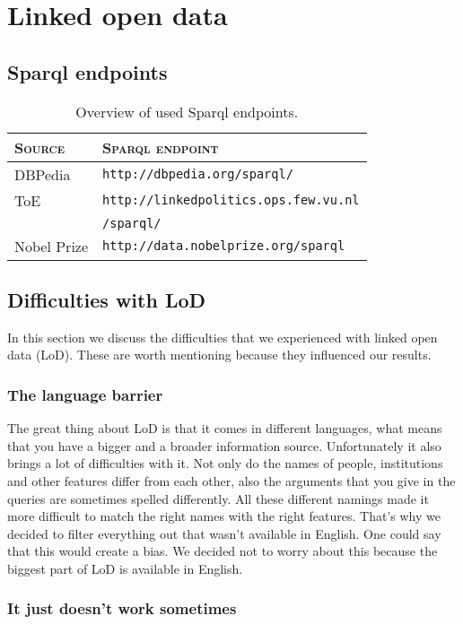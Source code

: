 \section{Linked open data}
\label{sec:lod}
\subsection{Sparql endpoints}
\begin{table}[H]
\centering
\begin{tabular}{l|l}
	\textbf{\textsc{Source}} & \textbf{\textsc{Sparql endpoint}} \\ \hline
	\rule{0pt}{4mm}DBPedia & \texttt{http://dbpedia.org/sparql/} \\
	ToE &  \texttt{http://linkedpolitics.ops.few.vu.nl} \\
	& \texttt{/sparql/} \\
	Nobel Prize & \texttt{http://data.nobelprize.org/sparql}
\end{tabular}
\caption{Overview of used Sparql endpoints.}
\end{table}
\subsection{Difficulties with LoD}
In this section we discuss the difficulties that we experienced with linked open data (LoD). These are worth mentioning because they influenced our results.

\subsubsection{The language barrier}
The great thing about LoD is that it comes in different languages, what means that you have a bigger and a broader information source.
Unfortunately it also brings a lot of difficulties with it.
Not only do the names of people, institutions and other features differ from each other, also the arguments that you give in the queries are sometimes spelled differently.
All these different namings made it more difficult to match the right names with the right features.
That's why we decided to filter everything out that wasn't available in English. One could say that this would create a bias. We decided not to worry about this because the biggest part of LoD is available in English.

\subsubsection{It just doesn't work sometimes}

